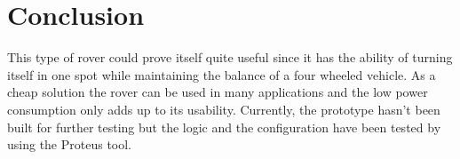 \section{Conclusion}

This type of rover could prove itself quite useful since it has the ability of turning itself in one spot while maintaining the balance of a four wheeled vehicle. As a cheap solution the rover can be used in many applications and the low power consumption only adds up to its usability. Currently, the prototype hasn't been built for further testing but the logic and the configuration have been tested by using the Proteus tool.